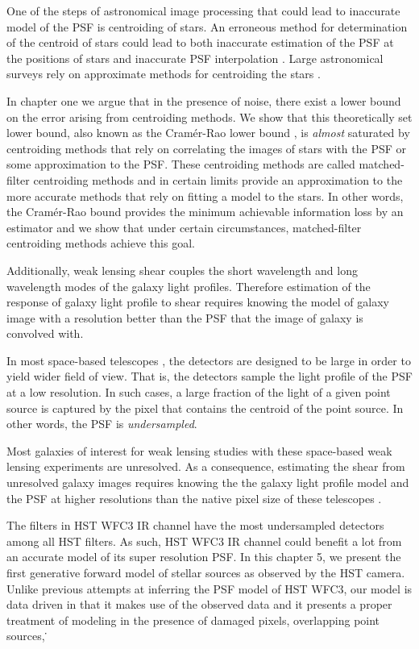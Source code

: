 One of the steps of astronomical image processing that could lead to inaccurate model of the PSF is centroiding 
of stars. An erroneous method for determination of the centroid of stars could lead to both inaccurate estimation of the 
PSF at the positions of stars and inaccurate PSF interpolation \citep{anderson2000,sdss,anderson2003,desc}. Large astronomical surveys rely on approximate 
methods for centroiding the stars \citep{sextractor,sdss,des}. 

In chapter one we argue that in the presence of noise, there exist
a lower bound on the error arising from centroiding methods. We show that this theoretically set lower bound, also known as the Cram\'{e}r-Rao lower bound \citep{lecam}, 
is \emph{almost} saturated by centroiding methods that rely on correlating the images of stars with the PSF or some approximation to the 
PSF. These centroiding methods are called matched-filter centroiding methods and in certain limits provide an approximation to the more accurate 
methods that rely on fitting a model to the stars. In other words, the Cram\'{e}r-Rao bound provides the minimum achievable information loss by an estimator and 
we show that under certain circumstances, matched-filter centroiding methods achieve this goal.

Additionally, weak lensing shear couples the short wavelength and long wavelength modes of the galaxy light profiles. 
Therefore estimation of the response of galaxy light profile to shear requires knowing the model of galaxy image 
with a resolution better than the PSF that the image of galaxy is convolved with. 

In most space-based telescopes \citep{euclid,wfirst}, the detectors are designed to be large in order to yield wider field of view. 
That is, the detectors sample the light profile of the PSF at a low resolution. In such cases, a large fraction of the light of a given point source 
is captured by the pixel that contains the centroid of the point source. In other words, the PSF is \emph{undersampled}.

Most galaxies of interest for weak lensing studies with these space-based weak lensing experiments are unresolved. 
As a consequence, estimating the shear from unresolved galaxy images requires 
knowing the the galaxy light profile model and the PSF at higher resolutions than the native pixel size of these telescopes \citep{olic,ngole2}.

The filters in HST WFC3 IR channel have the most undersampled detectors among all HST filters. 
As such, HST WFC3 IR channel could benefit a lot from an accurate model of its super resolution PSF. 
In this chapter 5, we present the first generative forward model of stellar sources as observed by the HST camera.
Unlike previous attempts at inferring the PSF model of HST WFC3, our model is data driven in that it makes 
use of the observed data and it presents a proper treatment of modeling in the presence of damaged pixels, overlapping 
point sources, \etc\.  

